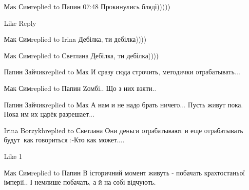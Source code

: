  
 
 
 
 

Мак Симreplied to Папин
07:48
Прокинулись бляді)))))

    Like
    Reply

Мак Симreplied to Irina
Дебілка, ти дебілка))))

Мак Симreplied to Светлана
Дебілка, ти дебілка))))

Папин Зайчикreplied to Мак
И сразу сюда строчить, методички отрабатывать...

Мак Симreplied to Папин
Zомбі.. Що з них взяти..

Папин Зайчикreplied to Мак
А нам и не надо брать ничего...
Пусть живут пока. Пока им их царёк разрешает...

Irina Borzykhreplied to Светлана
Они деньги отрабатывают и еще отрабатывать будут🤣😂как говориться :-Кто как может....

    Like 1

Мак Симreplied to Папин
В історичний момент живуть - побачать крахтостаньої імперії.. І немлише побачать, а й на собі відчують.
